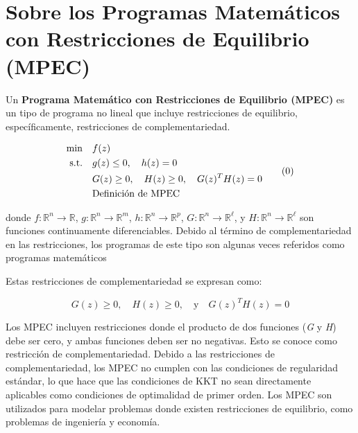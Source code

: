 \section{Sobre los Programas Matemáticos con Restricciones de Equilibrio (MPEC)}
Un \textbf{Programa Matemático con Restricciones de Equilibrio (MPEC)} es un tipo de programa no lineal que incluye restricciones de equilibrio, específicamente, restricciones de complementariedad.

\begin{equation}
\begin{aligned}
\min \quad & f(z) \notag \\
\text{s.t.} \quad & g(z) \leq 0, \quad h(z) = 0 \\
& G(z) \geq 0, \quad H(z) \geq 0, \quad G(z)^T H(z) = 0 \notag\\
&\text{Definición de MPEC} \notag\\
\end{aligned}  
\tag{\theequation} 
\label{eq:DefMpec}
\end{equation}

donde $f: \mathbb{R}^n \to \mathbb{R}$, $g: \mathbb{R}^n \to \mathbb{R}^m$, $h: \mathbb{R}^n \to \mathbb{R}^p$, $G: \mathbb{R}^n \to \mathbb{R}^\ell$, y $H: \mathbb{R}^n \to \mathbb{R}^\ell$ son funciones continuamente diferenciables. Debido al término de complementariedad en las restricciones, los programas de este tipo son algunas veces referidos como programas matemáticos

Estas restricciones de complementariedad se expresan como: 

\begin{equation}
    G(z) \geq 0, \quad H(z) \geq 0, \quad \text{y} \quad G(z)^T H(z) = 0 \label{eq:RestriccionesComplementariedadAbstracto}
\end{equation}

Los MPEC incluyen restricciones donde el producto de dos funciones (\textit{G} y \textit{H}) debe ser cero, y ambas funciones deben ser no negativas. Esto se conoce como restricción de complementariedad. Debido a las restricciones de complementariedad, los MPEC no cumplen con las condiciones de regularidad estándar, lo que hace que las condiciones de KKT no sean directamente aplicables como condiciones de optimalidad de primer orden. Los MPEC son utilizados para modelar problemas donde existen restricciones de equilibrio, como problemas de ingeniería y economía.

